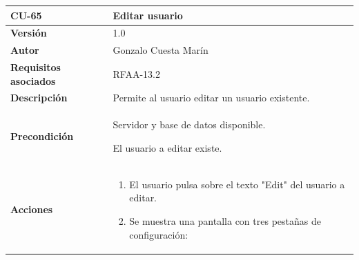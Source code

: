 \documentclass[
]{article}
\providecommand{\tightlist}{%
  \setlength{\itemsep}{0pt}\setlength{\parskip}{0pt}}
\begin{document}
\begin{longtable}[]{@{}ll@{}}
\toprule
\begin{minipage}[b]{0.21\columnwidth}\raggedright
\textbf{CU-65}\strut
\end{minipage} & \begin{minipage}[b]{0.73\columnwidth}\raggedright
\textbf{Editar usuario}\strut
\end{minipage}\tabularnewline
\midrule
\endhead
\begin{minipage}[t]{0.21\columnwidth}\raggedright
\textbf{Versión}\strut
\end{minipage} & \begin{minipage}[t]{0.73\columnwidth}\raggedright
1.0\strut
\end{minipage}\tabularnewline
\begin{minipage}[t]{0.21\columnwidth}\raggedright
\textbf{Autor}\strut
\end{minipage} & \begin{minipage}[t]{0.73\columnwidth}\raggedright
Gonzalo Cuesta Marín\strut
\end{minipage}\tabularnewline
\begin{minipage}[t]{0.21\columnwidth}\raggedright
\textbf{Requisitos asociados}\strut
\end{minipage} & \begin{minipage}[t]{0.73\columnwidth}\raggedright
RFAA-13.2\strut
\end{minipage}\tabularnewline
\begin{minipage}[t]{0.21\columnwidth}\raggedright
\textbf{Descripción}\strut
\end{minipage} & \begin{minipage}[t]{0.73\columnwidth}\raggedright
Permite al usuario editar un usuario existente.\strut
\end{minipage}\tabularnewline
\begin{minipage}[t]{0.21\columnwidth}\raggedright
\textbf{Precondición}\strut
\end{minipage} & \begin{minipage}[t]{0.73\columnwidth}\raggedright
Servidor y base de datos disponible.

El usuario a editar existe.\strut
\end{minipage}\tabularnewline
\begin{minipage}[t]{0.21\columnwidth}\raggedright
\textbf{Acciones}\strut
\end{minipage} & \begin{minipage}[t]{0.73\columnwidth}\raggedright
\begin{enumerate}
\def\labelenumi{\arabic{enumi}.}
\tightlist
\item
  El usuario pulsa sobre el texto "Edit" del usuario a editar.
\item
  Se muestra una pantalla con tres pestañas de configuración:


\end{enumerate}
\end{minipage}
\end{longtable}
\end{document}
